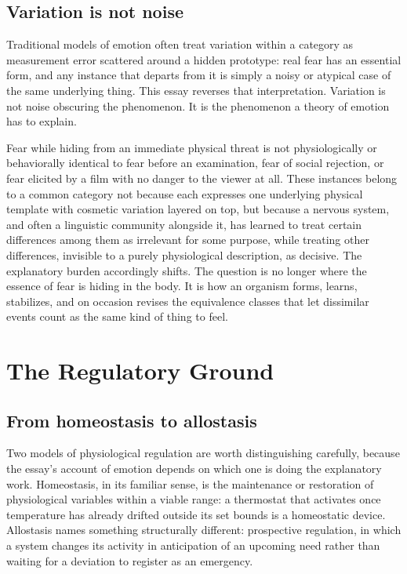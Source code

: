 \documentclass[11pt]{article}
\begin{document}
\subsection{Variation is not noise}

Traditional models of emotion often treat variation within a category as measurement error scattered around a hidden prototype: real fear has an essential form, and any instance that departs from it is simply a noisy or atypical case of the same underlying thing. This essay reverses that interpretation. Variation is not noise obscuring the phenomenon. It is the phenomenon a theory of emotion has to explain.

Fear while hiding from an immediate physical threat is not physiologically or behaviorally identical to fear before an examination, fear of social rejection, or fear elicited by a film with no danger to the viewer at all. These instances belong to a common category not because each expresses one underlying physical template with cosmetic variation layered on top, but because a nervous system, and often a linguistic community alongside it, has learned to treat certain differences among them as irrelevant for some purpose, while treating other differences, invisible to a purely physiological description, as decisive. The explanatory burden accordingly shifts. The question is no longer where the essence of fear is hiding in the body. It is how an organism forms, learns, stabilizes, and on occasion revises the equivalence classes that let dissimilar events count as the same kind of thing to feel.

\section{The Regulatory Ground}\label{sec:regulatory}

\subsection{From homeostasis to allostasis}

Two models of physiological regulation are worth distinguishing carefully, because the essay's account of emotion depends on which one is doing the explanatory work. Homeostasis, in its familiar sense, is the maintenance or restoration of physiological variables within a viable range: a thermostat that activates once temperature has already drifted outside its set bounds is a homeostatic device. Allostasis names something structurally different: prospective regulation, in which a system changes its activity in anticipation of an upcoming need rather than waiting for a deviation to register as an emergency.
\end{document}
